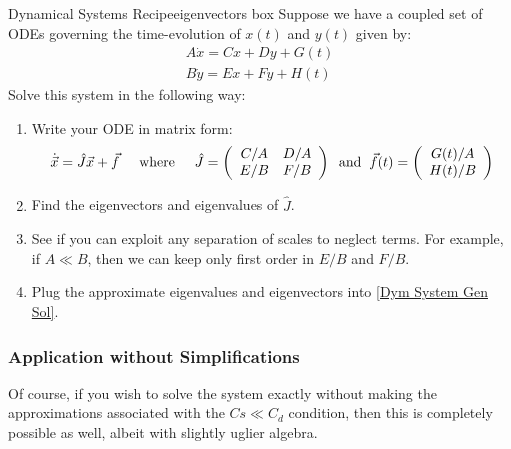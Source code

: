 \begin{fact}{Dynamical Systems Recipe}{eigenvectors box}\label{eigenvectors box}
    Suppose we have a coupled set of ODEs governing the time-evolution of $x(t)$ and $y(t)$ given by:
    \begin{align*}
        A \dot{x}= Cx + Dy + G(t)\\
        B \dot{y} = Ex + Fy + H(t)
    \end{align*}
    Solve this system in the following way:
    \begin{enumerate}
        \item Write your ODE in matrix form:
            \begin{align*}
                \dot{\vec{x}}=\hat{J}\vec{x}+\vec{f} \hspace{5 mm}\text{where} \hspace{5 mm}\hat{J} = \left( \begin{array}{cc}
                    C/A & D/A \\
                    E/B & F/B
                \end{array} \right)
                \hspace{2 mm}\text{and} \hspace{2 mm}
                \vec{f}(t)=\left( \begin{array}{c}
                    G(t)/A \\
                    H(t)/B
                \end{array} \right)
            \end{align*}
        \item Find the eigenvectors and eigenvalues of $\hat{J}$.
        \item See if you can exploit any separation of scales to neglect terms. For example, if $A\ll B$, then we can keep only first order in $E/B$ and $F/B$. 
        \item Plug the approximate eigenvalues and eigenvectors into \ref{Dym System Gen Sol}.
    \end{enumerate}
\end{fact}

\subsubsection{Application without Simplifications}

Of course, if you wish to solve the system exactly without making the approximations associated with the $Cs\ll C_d$ condition, then this is completely possible as well, albeit with slightly uglier algebra.

